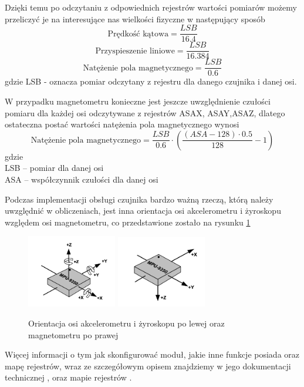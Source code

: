 Dzięki temu po odczytaniu z odpowiednich rejestrów wartości pomiarów możemy przeliczyć je na interesujące nas wielkości fizyczne w następujący sposób
$$
    \textrm{Prędkość kątowa} = \frac{LSB}{16.4}
$$
$$
    \textrm{Przyspieszenie liniowe} = \frac{LSB}{16.384}
$$
$$
    \textrm{Natężenie pola magnetycznego} = \frac{LSB}{0.6}
$$
gdzie LSB - oznacza pomiar odczytany z rejestru dla danego czujnika i danej osi.

W przypadku magnetometru konieczne jest jeszcze uwzględnienie czułości pomiaru dla każdej osi odczytywane z rejestrów ASAX, ASAY,ASAZ, dlatego ostateczna postać wartości natężenia pola magnetycznego wynosi
$$
    \textrm{Natężenie pola magnetycznego} = \frac{LSB}{0.6} \cdot \left(\frac{(ASA-128)\cdot 0.5}{128}-1\right)
$$
gdzie \\
LSB -- pomiar dla danej osi \\
ASA -- współczynnik czułości dla danej osi

Podczas implementacji obsługi czujnika bardzo ważną rzeczą, którą należy uwzględnić w obliczeniach, jest inna orientacja osi akcelerometru i żyroskopu względem osi magnetometru, co przedstawione zostało na rysunku \ref{Orientacja}

\begin{figure}[h!]
    \centering
    \includegraphics[width=0.35\textwidth]{Rysunki/Rozdzial05/AcceGyro_osie.png}
    \includegraphics[width=0.35\textwidth]{Rysunki/Rozdzial05/Mag_osie.png}
    \caption{Orientacja osi akcelerometru i żyroskopu po lewej oraz magnetometru po prawej }
    \label{Orientacja}
\end{figure}

Więcej informacji o tym jak skonfigurować moduł, jakie inne funkcje posiada oraz mapę rejestrów, wraz ze szczegółowym opisem znajdziemy w jego dokumentacji technicznej \cite{MPU9250datascheet}, oraz mapie rejestrów \cite{MPU9250registermap}. 


